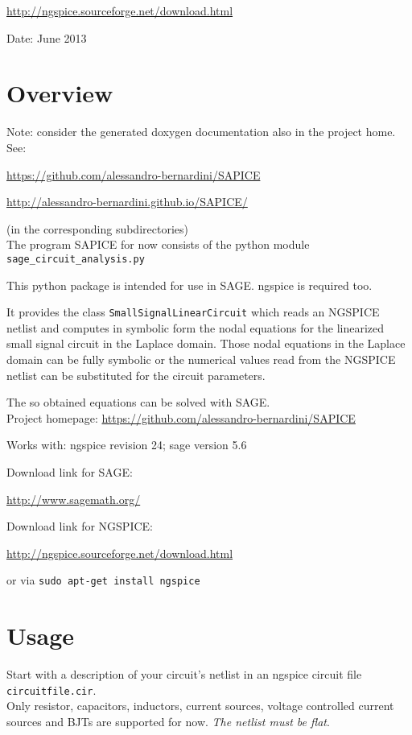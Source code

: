 \documentclass[a4paper]{article}
\begin{document}
\url{http://ngspice.sourceforge.net/download.html}


Date: June 2013
\section{Overview}
Note: consider the generated doxygen documentation also in the project home. See:

\url{https://github.com/alessandro-bernardini/SAPICE}

\url{http://alessandro-bernardini.github.io/SAPICE/}

(in the corresponding subdirectories)\\

The program SAPICE for now consists of the python module {\tt sage\_circuit\_analysis.py}

This python package is intended for use in SAGE. ngspice is required too.

It provides the class  {\tt SmallSignalLinearCircuit} which reads an NGSPICE netlist and computes in symbolic form the nodal equations for the linearized small signal circuit in the Laplace domain. Those nodal equations in the Laplace domain can be fully symbolic or the numerical values read from the NGSPICE netlist can be substituted for the circuit parameters.

The so obtained equations can be solved with SAGE.\\

Project homepage:
\url{https://github.com/alessandro-bernardini/SAPICE}

Works with: ngspice revision 24; sage version 5.6

Download link for SAGE:

\url{http://www.sagemath.org/}

Download link for NGSPICE:

\url{http://ngspice.sourceforge.net/download.html}

or via {\tt sudo apt-get install ngspice}

\section{Usage}
Start with a description of your circuit's netlist in an ngspice circuit file {\tt circuitfile.cir}.\\

Only resistor, capacitors, inductors, current sources, voltage controlled current sources and BJTs are supported for now. \emph{The netlist must be flat}.
\end{document}
